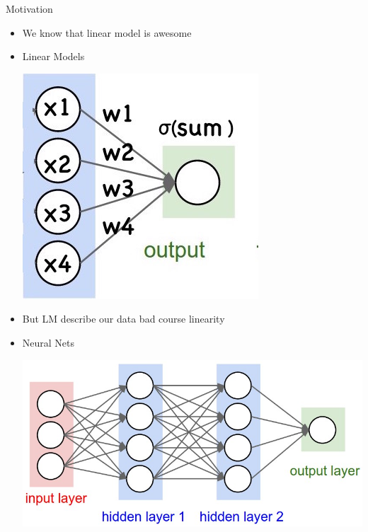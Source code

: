 \documentclass{beamer}
\begin{document}
\begin{frame}{Motivation}	
 	\begin{itemize}
 		  \item We know that linear model is awesome 
	 	  \item Linear Models
		 	\begin{center}
		 		  \includegraphics[scale=0.2]{img/nnn1}	
		 	\end{center}
 		  \item But LM describe our data bad course linearity 
	 	  \item Neural Nets
		 \begin{center}
	 			 	  \includegraphics[scale=0.2]{img/nnn2}	
		 \end{center}
 	\end{itemize}
\end{frame}
\end{document}
